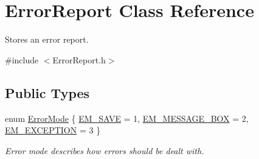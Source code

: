 \hypertarget{class_error_report}{
\section{ErrorReport Class Reference}
\label{class_error_report}
}


Stores an error report.  




{\ttfamily \#include $<$ErrorReport.h$>$}

\subsection*{Public Types}
\begin{DoxyCompactItemize}
\item 
enum \hyperlink{class_error_report_ab70777b4cf64240281ddd4217664f683}{ErrorMode} \{ \hyperlink{class_error_report_ab70777b4cf64240281ddd4217664f683a8ab8b12d7e1c3dcc392f15390ca1bb92}{EM\_\-SAVE} =  1, 
\hyperlink{class_error_report_ab70777b4cf64240281ddd4217664f683ac068e8e545daa37db2310c4123d457b7}{EM\_\-MESSAGE\_\-BOX} =  2, 
\hyperlink{class_error_report_ab70777b4cf64240281ddd4217664f683a0f7be56a26a11b9c4f1fe287f952375f}{EM\_\-EXCEPTION} =  3
 \}
\begin{DoxyCompactList}\small\item\em Error mode describes how errors should be dealt with. \item\end{DoxyCompactList}\end{DoxyCompactItemize}
